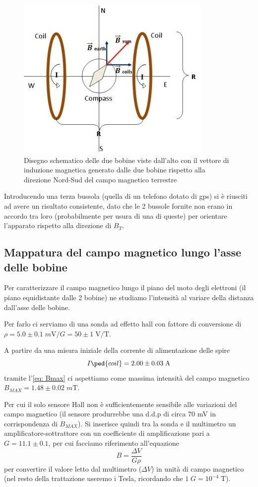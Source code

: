 \documentclass[10pt, a4paper, italian]{article}
\begin{document}
\begin{figure}[htbp]
    \centering
	\includegraphics[scale=0.7]{compass}
    \caption{Disegno schematico delle due bobine viste dall'alto con il
    vettore di induzione magnetica generato dalle due bobine rispetto alla
    direzione Nord-Sud del campo magnetico terrestre
    \label{fig: compass}}
\end{figure}

Introducendo una terza bussola (quella di un telefono dotato di gps) si è
riusciti ad avere un risultato consistente, dato che le 2 bussole fornite non
erano in accordo tra loro (probabilmente per usura di una di queste)
per orientare l'apparato rispetto alla direzione di $B_T$.

\subsection{Mappatura del campo magnetico lungo l'asse delle bobine}
\label{sec:map}
Per caratterizzare il campo magnetico lungo il piano del moto degli elettroni
(il piano equidistante dalle 2 bobine) ne studiamo l'intensità al variare
della distanza dall'asse delle bobine.

Per farlo ci serviamo di una sonda ad effetto hall con fattore di conversione
di $\rho = 5.0 \pm 0.1 \; \si{m\V/G} = 50 \pm 1 \; \si{\V/\tesla}$.

A partire da una misura iniziale della corrente di alimentazione delle
spire
\[
I\ped{coil} = 2.00 \pm 0.03 \; \si{\A}
\]
tramite l'\cref{eq: Bmax} ci aspettiamo come massima intensità del campo
magnetico $B_{MAX} = 1.48 \pm 0.02 \; \si{m\tesla}$.

Per cui il solo sensore Hall non è sufficientemente sensibile alle variazioni
del campo magnetico (il sensore produrrebbe una d.d.p di circa 70 mV in
corrispondenza di $B_{MAX}$).
Si inserisce quindi tra la sonda e il multimetro un amplificatore-sottrattore
con un coefficiente di amplificazione pari a $G = 11.1 \pm 0.1$, per cui
facciamo riferimento all'equazione
\begin{equation}
B = \frac{\Delta V}{G \rho}
\end{equation}
per convertire il valore letto dal multimetro ($\Delta V$) in unità di campo
magnetico (nel resto della trattazione useremo i Tesla, ricordando che
$1 \; \si{G} = 10^{-4} \; \si{\tesla}$).
\end{document}
